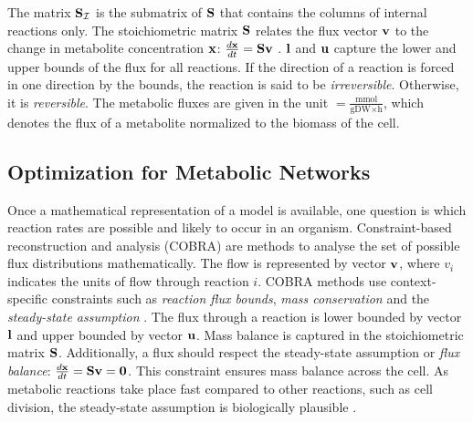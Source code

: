 The matrix $\bold S_\mathcal{I}$ is the submatrix of $\bold S$ that contains the columns of internal reactions only. 
The stoichiometric matrix $\bold S$ relates the flux vector $\bold v$ to the change in metabolite concentration $\bold x$: $\frac{d \bold x}{dt} = \bold S \bold v$ \cite{noor_removing_2018}. 
$\bold l$ and $\bold u$ capture the lower and upper bounds of the flux for all reactions. If the direction of a reaction is forced in one direction by the bounds, the reaction is said to be \textit{irreversible}. Otherwise, it is \textit{reversible}.
The metabolic fluxes are given in the unit $= \frac{\text{mmol}}{\text{gDW} \times \text{h}}$, which denotes the flux of a metabolite normalized to the biomass of the cell.

\subsection{Optimization for Metabolic Networks} \label{section:optimization_gems}
Once a mathematical representation of a model is available, one question is which reaction rates are possible and likely to occur in an organism. Constraint-based reconstruction and analysis (COBRA) are methods to analyse the set of possible flux distributions mathematically. The flow is represented by vector $\bold v$, where $v_i$ indicates the units of flow through reaction $i$. 
COBRA methods use context-specific constraints such as \textit{reaction flux bounds}, \textit{mass conservation} and the \textit{steady-state assumption} \cite{cobrapy}. The flux through a reaction is lower bounded by vector $\bold l$ and upper bounded by vector $\bold u$. Mass balance is captured in the stoichiometric matrix $\bold S$. Additionally, a flux should respect the steady-state assumption or \textit{flux balance}: $\frac{d \bold x}{dt} = \bold S \bold v= \bold 0$. This constraint ensures mass balance across the cell. 
As metabolic reactions take place fast compared to other reactions, such as cell division, the steady-state assumption is biologically plausible \cite{enumerate_extreme_rays}.

